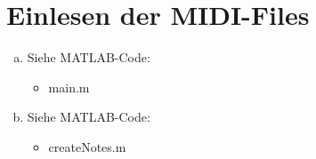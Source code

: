 \chapter{Einlesen der MIDI-Files}


\begin{enumerate}[a)]
\item
Siehe MATLAB-Code:
\begin{itemize}
\item
main.m
\end{itemize}
\item
Siehe MATLAB-Code:
\begin{itemize}
\item
createNotes.m
\end{itemize}
\end{enumerate}
